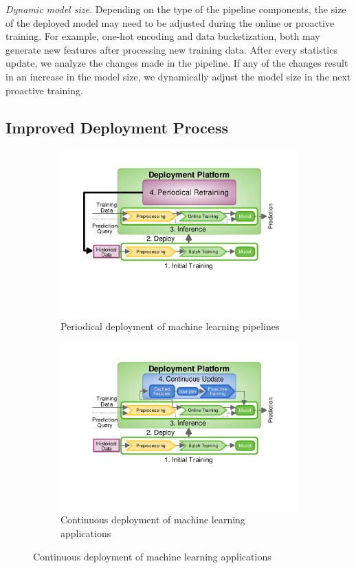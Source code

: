 \textit{Dynamic model size.}
Depending on the type of the pipeline components, the size of the deployed model may need to be adjusted during the online or proactive training.
For example, one-hot encoding and data bucketization, both may generate new features after processing new training data.
After every statistics update, we analyze the changes made in the pipeline.
If any of the changes result in an increase in the model size, we dynamically adjust the model size in the next proactive training. 


\subsection{Improved Deployment Process}
\begin{figure}[t]
\begin{subfigure}{\columnwidth}
\centering
\includegraphics[width=\columnwidth]{../images/generic-motivational-example-v2.pdf}
\caption{Periodical deployment of machine learning pipelines}
\label{fig:motivational-example}
\end{subfigure}%
\begin{subfigure}{\columnwidth}
\centering
\includegraphics[width=\columnwidth]{../images/generic-improved-example-v2.pdf}
\caption{Continuous deployment of machine learning applications}
\label{fig:improved-example}
\end{subfigure}
\end{figure}

